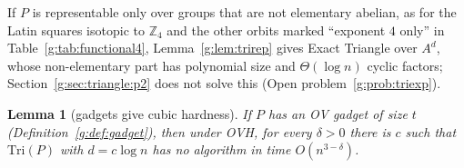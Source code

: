 \documentclass[11pt]{article}
\newtheorem{lemma}[theorem]{Lemma}
\theoremstyle{definition}
\theoremstyle{remark}
\newcommand{\Z}{\mathbb{Z}}
\begin{document}
If $P$ is representable only over groups that are not elementary abelian, as for the Latin squares isotopic to $\Z_4$ and the other orbits marked ``exponent $4$ only'' in Table~\ref{g:tab:functional4}, Lemma~\ref{g:lem:trirep} gives Exact Triangle over $A^d$, whose non-elementary part has polynomial size and $\Theta(\log n)$ cyclic factors; Section~\ref{g:sec:triangle:p2} does not solve this (Open problem~\ref{g:prob:triexp}).

\begin{lemma}[gadgets give cubic hardness]\label{g:lem:trigadget}
If $P$ has an OV gadget of size $t$ (Definition~\ref{g:def:gadget}), then under OVH, for every $\delta>0$ there is $c$ such that $\mathrm{Tri}(P)$ with $d=c\log n$ has no algorithm in time $O(n^{3-\delta})$.
\end{lemma}
\end{document}
